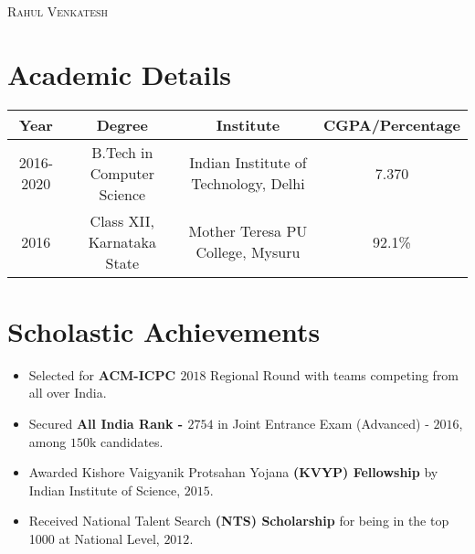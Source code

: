 \documentclass{article}
\begin{document}
\begin{center} {\Large \textsc{Rahul Venkatesh}}\end{center}

\section*{Academic Details}
\begin{center} \begin{tabular}{ | c | c | c | c |}
    \hline

    \textbf{Year} &
    \textbf{Degree} &
    \textbf{Institute} &
    \textbf{CGPA/Percentage} \\

    \hline

    2016-2020 &
    B.Tech in Computer Science &
    Indian Institute of Technology, Delhi &
    7.370 \\

    \hline

    2016 &
    Class XII,
    Karnataka State &
    Mother Teresa PU College, Mysuru &
    92.1\% \\

    \hline
\end{tabular} \end{center}

\section*{Scholastic Achievements}
\begin{itemize}[noitemsep,nolistsep]
    \item
        Selected for \textbf{ACM-ICPC $2018$} Regional Round with teams
        competing from all over India.
    \item
        Secured \textbf{All India Rank - $2754$} in Joint Entrance Exam
        (Advanced) - $2016$, among $150$k candidates.
    \item
        Awarded Kishore Vaigyanik Protsahan Yojana \textbf{(KVYP) Fellowship} by
        Indian Institute of Science, $2015$.
    \item
        Received National Talent Search \textbf{(NTS) Scholarship} for being
        in the top 1000 at National Level, $2012$.
\end{itemize}
\end{document}
